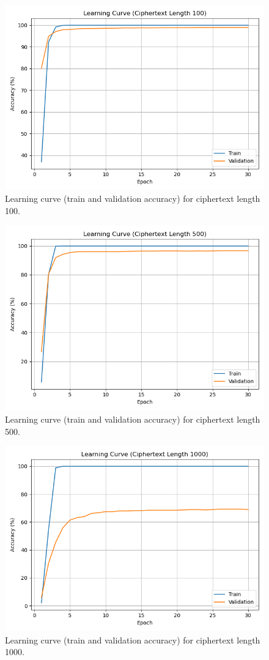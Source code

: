 \documentclass[manuscript,screen,acmtog,natbib=false]{acmart}
\begin{document}
  \begin{figure}[h]
      \centering
      \includegraphics[width=0.7\linewidth]{./media/learning_curve_100.png}
      \caption{Learning curve (train and validation accuracy) for ciphertext length 100.}
      \label{fig:curve-100}
  \end{figure}

  \begin{figure}[h]
      \centering
      \includegraphics[width=0.7\linewidth]{./media/learning_curve_500.png}
      \caption{Learning curve (train and validation accuracy) for ciphertext length 500.}
      \label{fig:curve-500}
  \end{figure}

  \begin{figure}[h]
      \centering
      \includegraphics[width=0.7\linewidth]{./media/learning_curve_1000.png}
      \caption{Learning curve (train and validation accuracy) for ciphertext length 1000.}
      \label{fig:curve-1000}
  \end{figure}
\end{document}
